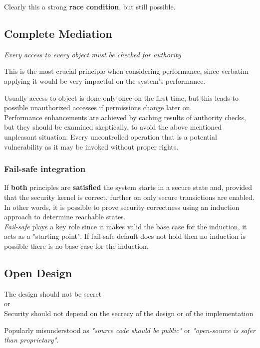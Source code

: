 Clearly this a strong \textbf{race condition}, but still possible.

\subsection{Complete Mediation}
\begin{center}
   \textit{Every access to every object must be checked for authority}
\end{center}

This is the most crucial principle when considering performance,
since verbatim applying it would be very impactful on the system's performance.

Usually access to object is done only once on the first time,
but this leads to possible unauthorized accesses if permissions change later on.\\
Performance enhancements are achieved by caching results of
authority checks,
but they should be examined skeptically,
to avoid the above mentioned unpleasant situation.
Every uncontrolled operation that is a potential vulnerability as it may be invoked without proper rights.

\subsubsection{Fail-safe integration}
If \textbf{both} principles are \textbf{satisfied} the system starts in a secure state and,
provided that the security kernel is correct, further on only secure transictions are enabled.
In other words, it is possible to prove security correctness using an induction approach to determine reachable states.\\
\textit{Fail-safe} plays a key role since it makes valid the base case for the induction, it acts as a "starting point".
If fail-safe default does not hold then no induction is possible
there is no base case for the induction.

\subsection{Open Design}
\begin{center}
   
   The design should not be secret\\
   or\\
   Security should not depend on the secrecy of
   the design or of the implementation
\end{center}
Popularly misunderstood as
\textit{"source code should be public"} or \textit{"open-source is safer than proprietary"}.

